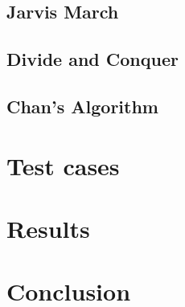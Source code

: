 \documentclass{article}
\begin{document}
\subsection*{Jarvis March}
\subsection*{Divide and Conquer}
\subsection*{Chan's Algorithm}

\section*{Test cases}

\section*{Results}

\section*{Conclusion}
\end{document}

